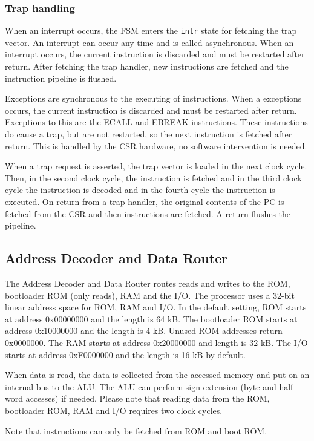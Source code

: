 \documentclass[12pt]{article}
\begin{document}
\subsubsection{Trap handling}
When an interrupt occurs, the FSM enters the \texttt{intr} state for fetching the trap vector. An interrupt can occur any time and is called asynchronous. When an interrupt occurs,
the current instruction is discarded and must be restarted after return. After fetching the trap handler, new instructions are fetched and the instruction pipeline is flushed.

Exceptions are synchronous to the executing of instructions. When a exceptions occurs, the current instruction is discarded and must be restarted after return. Exceptions to this are the ECALL and EBREAK instructions. These instructions do cause a trap, but are not restarted, so the next instruction is fetched after return. This is handled by the CSR hardware, no software intervention is needed.

When a trap request is asserted, the trap vector is loaded in the next clock cycle. Then, in the second clock cycle, the instruction is fetched and in the third clock cycle the instruction is decoded and in the fourth cycle the instruction is executed. On return from a trap handler, the original contents of the PC is fetched from the CSR and then instructions are fetched. A return flushes the pipeline.


\subsection{Address Decoder and Data Router}
\label{sec:addressdecoderanddatarouter}
The Address Decoder and Data Router routes reads and writes to the ROM, bootloader ROM (only reads), RAM and the I/O. The processor uses a 32-bit linear address space for ROM, RAM and I/O. In the default setting, ROM starts at address 0x00000000 and the length is 64 kB. The bootloader ROM starts at address 0x10000000 and the length is 4 kB. Unused ROM addresses return 0x0000000. The RAM starts at address 0x20000000 and length is 32 kB. The I/O starts at address 0xF0000000 and the length is 16 kB by default.

When data is read, the data is collected from the accessed memory and put on an internal bus to the ALU. The ALU can perform sign extension (byte and half word accesses) if needed. Please note that reading data from the ROM, bootloader ROM, RAM and I/O requires two clock cycles.

Note that instructions can only be fetched from ROM and boot ROM.
\end{document}
